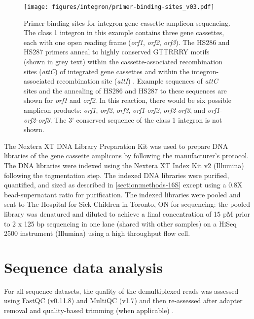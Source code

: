 \begin{figure}[htpb]
	\centering
		\texttt{[image: figures/integron/primer-binding-sites\_v03.pdf]}
	\caption[Primer-binding sites for integron gene cassette amplicon sequencing.]{
		Primer-binding sites for integron gene cassette amplicon sequencing.
		The class 1 integron in this example contains three gene cassettes, each with one open reading frame (\textit{orf1}, \textit{orf2}, \textit{orf3}).
		The HS286 and HS287 primers anneal to highly conserved GTTRRRY motifs (shown in grey text) within the cassette-associated recombination sites (\textit{attC}) of integrated gene cassettes and within the integron-associated recombination site (\textit{attI}) \parencite{Stokes.2001}.
		Example sequences of \textit{attC} sites and the annealing of HS286 and HS287 to these sequences are shown for \textit{orf1} and \textit{orf2}.
		In this reaction, there would be six possible amplicon products:
		\textit{orf1}, \textit{orf2}, \textit{orf3}, \textit{orf1}-\textit{orf2}, \textit{orf2}-\textit{orf3}, and \textit{orf1}-\textit{orf2}-\textit{orf3}.
		The 3' conserved sequence of the class 1 integron is not shown.
	}
	\label{fig:primer-binding-sites}
\end{figure}

The Nextera\textsuperscript{\textregistered{}} XT DNA Library Preparation Kit was used to prepare DNA libraries of the gene cassette amplicons by following the manufacturer’s protocol.
The DNA libraries were indexed using the Nextera\textsuperscript{\textregistered{}} XT Index Kit v2 (Illumina) following the tagmentation step.
The indexed DNA libraries were purified, quantified, and sized as described in \ref{section:methods-16S} except using a 0.8X bead-supernatant ratio for purification.
The indexed libraries were pooled and sent to The Hospital for Sick Children in Toronto, ON for sequencing:
the pooled library was denatured and diluted to achieve a final concentration of 15 pM prior to 2 x 125 bp sequencing in one lane (shared with other samples) on a HiSeq 2500 instrument (Illumina) using a high throughput flow cell.

\section{Sequence data analysis}

For all sequence datasets, the quality of the demultiplexed reads was assessed using FastQC (v0.11.8) and MultiQC (v1.7) and then re-assessed after adapter removal and quality-based trimming (when applicable) \parencite{Andrews.2010, Ewels.2016}.

